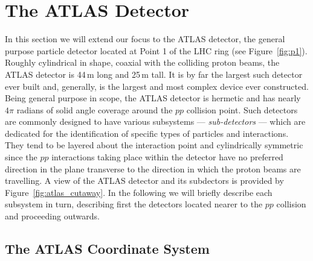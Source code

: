 \section{The ATLAS Detector}
\label{sec:atlas}

In this section we will extend our focus to the ATLAS detector, the general purpose
particle detector located at Point 1 of the LHC ring (see Figure~\ref{fig:p1}).
Roughly cylindrical in shape, coaxial with the colliding proton beams,
the ATLAS detector is 44\,m long and 25\,m tall.
It is by far the largest such detector ever built and,
generally, is the largest and most complex device ever constructed.
Being general purpose in scope, the ATLAS detector is hermetic and has
nearly $4\pi$ radians of solid angle coverage around the $pp$ collision
point. 
Such detectors are commonly designed to have various subsystems --- \textit{sub-detectors} ---
which are dedicated for the identification of specific types of particles
and interactions.
They tend to be layered about the interaction point and cylindrically symmetric
since the $pp$ interactions taking place within the detector have no preferred
direction in the plane transverse to the direction in which the proton beams
are travelling.
A view of the ATLAS detector and its subdectors is provided by Figure~\ref{fig:atlas_cutaway}.
In the following we will briefly describe each subsystem in turn, describing
first the detectors located nearer to the $pp$ collision and proceeding outwards.

\subsection{The ATLAS Coordinate System}
\label{sec:atlas_coordinate_system}

